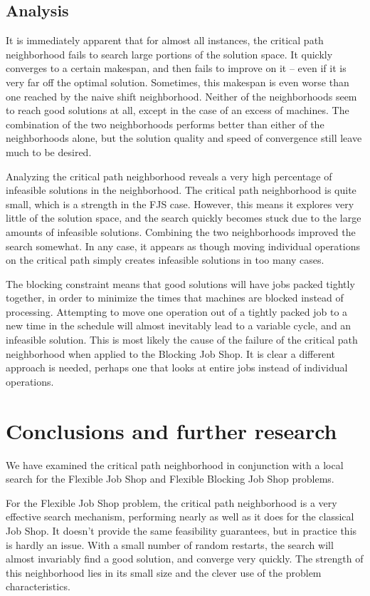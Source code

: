 \documentclass[a4paper,10pt]{article}
\begin{document}
\subsection{Analysis}

It is immediately apparent that for almost all instances, the critical path neighborhood fails to search large portions of the solution space. It quickly converges to a certain makespan, and then fails to improve on it -- even if it is very far off the optimal solution. Sometimes, this makespan is even worse than one reached by the naive shift neighborhood. Neither of the neighborhoods seem to reach good solutions at all, except in the case of an excess of machines. The combination of the two neighborhoods performs better than either of the neighborhoods alone, but the solution quality and speed of convergence still leave much to be desired.

Analyzing the critical path neighborhood reveals a very high percentage of infeasible solutions in the neighborhood. The critical path neighborhood is quite small, which is a strength in the FJS case. However, this means it explores very little of the solution space, and the search quickly becomes stuck due to the large amounts of infeasible solutions. Combining the two neighborhoods improved the search somewhat. In any case, it appears as though moving individual operations on the critical path simply creates infeasible solutions in too many cases.

The blocking constraint means that good solutions will have jobs packed tightly together, in order to minimize the times that machines are blocked instead of processing. Attempting to move one operation out of a tightly packed job to a new time in the schedule will almost inevitably lead to a variable cycle, and an infeasible solution. This is most likely the cause of the failure of the critical path neighborhood when applied to the Blocking Job Shop. It is clear a different approach is needed, perhaps one that looks at entire jobs instead of individual operations.

\section{Conclusions and further research}

We have examined the critical path neighborhood in conjunction with a local search for the Flexible Job Shop and Flexible Blocking Job Shop problems.

For the Flexible Job Shop problem, the critical path neighborhood is a very effective search mechanism, performing nearly as well as it does for the classical Job Shop. It doesn't provide the same feasibility guarantees, but in practice this is hardly an issue. With a small number of random restarts, the search will almost invariably find a good solution, and converge very quickly. The strength of this neighborhood lies in its small size and the clever use of the problem characteristics.
\end{document}

